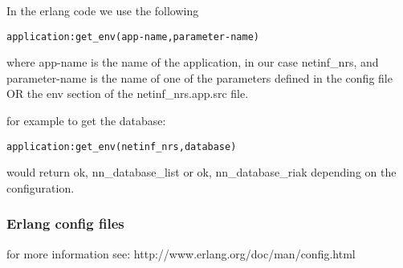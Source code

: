 In the erlang code we use the following 

\begin {verbatim}
application:get_env(app-name,parameter-name) 
\end{verbatim}

where app-name is the name of the application, in our case netinf\_nrs, and parameter-name is the name of one of the parameters defined in the config file OR the env section of the netinf\_nrs.app.src file.

for example to get the database:

\begin {verbatim}
application:get_env(netinf_nrs,database) 
\end{verbatim}

would return {ok, nn\_database\_list} or {ok, nn\_database\_riak} depending on the configuration. 


\subsubsection  {Erlang config files}

for more information see: http://www.erlang.org/doc/man/config.html
